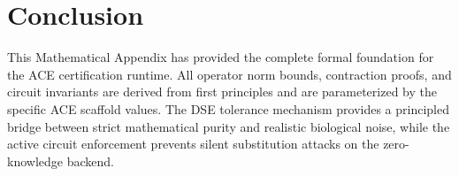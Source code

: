 \documentclass[11pt]{article}
\begin{document}
\section{Conclusion}

This Mathematical Appendix has provided the complete formal foundation for the ACE certification runtime. All operator norm bounds, contraction proofs, and circuit invariants are derived from first principles and are parameterized by the specific ACE scaffold values. The DSE tolerance mechanism provides a principled bridge between strict mathematical purity and realistic biological noise, while the active circuit enforcement prevents silent substitution attacks on the zero-knowledge backend.

\nocite{*}
  

\end{document}
